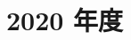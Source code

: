 \documentclass[../../hsm_tok_a.tex]{subfiles}
\begin{document}
    \section{2020 年度}

    

    \clearpage

    
\end{document}
